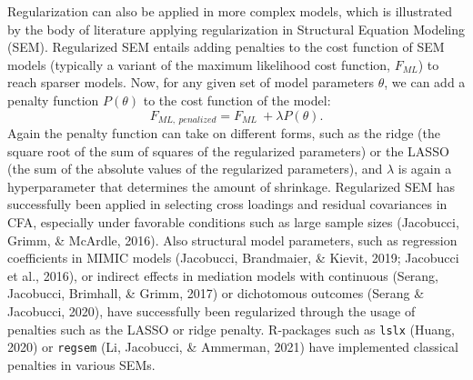 \documentclass[
  man, donotrepeattitle,floatsintext]{apa6}
\begin{document}
Regularization can also be applied in more complex models, which is
illustrated by the body of literature applying regularization in
Structural Equation Modeling (SEM). Regularized SEM entails adding
penalties to the cost function of SEM models (typically a variant of the
maximum likelihood cost function, \(F_{ML}\)) to reach sparser models.
Now, for any given set of model parameters \(\theta\), we can add a
penalty function \(P(\theta)\) to the cost function of the model:
\[F_{ML, \ penalized} = F_{ML} \ + \lambda P(\theta).\] Again the
penalty function can take on different forms, such as the ridge (the
square root of the sum of squares of the regularized parameters) or the
LASSO (the sum of the absolute values of the regularized parameters),
and \(\lambda\) is again a hyperparameter that determines the amount of
shrinkage. Regularized SEM has successfully been applied in selecting
cross loadings and residual covariances in CFA, especially under
favorable conditions such as large sample sizes
(Jacobucci, Grimm, \& McArdle, 2016). Also structural model parameters, such as
regression coefficients in MIMIC models (Jacobucci, Brandmaier, \& Kievit, 2019; Jacobucci et al., 2016), or indirect effects in mediation models with
continuous (Serang, Jacobucci, Brimhall, \& Grimm, 2017) or dichotomous outcomes
(Serang \& Jacobucci, 2020), have successfully been regularized through
the usage of penalties such as the LASSO or ridge penalty. R-packages
such as \texttt{lslx} (Huang, 2020) or \texttt{regsem}
(Li, Jacobucci, \& Ammerman, 2021) have implemented classical penalties in various SEMs.
\end{document}
